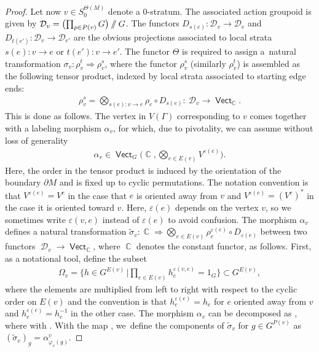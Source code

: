 \documentclass[10pt,a4paper]{amsart}
\DeclareMathOperator{\vect}{\mathsf{Vect}}
\DeclareMathOperator{\C}{\mathbb{C}}
\DeclareMathOperator{\cald}{\mathcal{D}}
\newcommand{\sslash}{\mathbin{/\mkern-6mu/}}
\numberwithin{equation}{section}
\theoremstyle{definition}
\begin{document}
\begin{proof}
 Let now $v \in S_0^{\Theta(M)}$ denote a 0-stratum. The associated action groupoid is given by $\mathcal{D}_v = \bigl(\prod_{p \in P(v)}G\bigr) \sslash G$. The functors $D_{s(e)}\colon \mathcal{D}_{v} \rightarrow \mathcal{D}_e$ and $D_{t(e')}\colon \mathcal{D}_{v} \rightarrow \mathcal{D}_{e'}$ are the obvious projections associated to local strata $s(e)\colon v \rightarrow e$ or $t(e')\colon v \rightarrow e'$. The functor $\Theta$ is required to assign a~natural transformation $\sigma_v\colon \rho_v^t \Rightarrow \rho_v^s$, where the functor $\rho_v^s$ (similarly $\rho_v^t$) is assembled as the following tensor product, indexed by local strata associated to starting edge ends:
 \begin{align*}
 \rho_v^s = \bigotimes_{s(e)\colon v \rightarrow e}\rho_e \circ D_{s(e)}\colon \ \mathcal{D}_v \rightarrow \vect_{\C}.
 \end{align*}
 This is done as follows. The vertex in $V(\Gamma)$ corresponding to $v$ comes together with a labeling morphism $\alpha_v$, for which, due to pivotality, we can assume without loss of generality
 \begin{align*}
 \alpha_v \in \vect_G\biggl(\C, \bigotimes_{e \in E(v)}V^{\varepsilon(e)}\biggr).
 \end{align*}
 Here, the order in the tensor product is induced by the orientation of the boundary $\partial M$ and is fixed up to cyclic permutations. The notation convention is that $V^{\varepsilon(e)} = V^e$ in the case that $e$ is oriented away from $v$ and $V^{\varepsilon(e)} = (V^e)^*$ in the case it is oriented toward $v$. Here, $\varepsilon(e)$ depends on the vertex $v$, so we sometimes write $\varepsilon(v, e)$ instead of $\varepsilon(e)$ to avoid confusion.
 The morphism $\alpha_v$ defines a natural transformation $\widetilde{\sigma}_v\colon \C \Rightarrow \bigotimes_{e \in E(v)} \rho_e^{\varepsilon(e)}\circ D_{\varepsilon(e)}$ between two functors $\cald_v \rightarrow \vect_{\C}$, where $\C$ denotes the constant functor, as follows. First, as a notational tool, define the subset
 \begin{align*}
 \Omega_v = \bigg\{h \in G^{E(v)} \, \bigg| \prod_{e \in E(v)}h_e^{\varepsilon(v, e)} = 1_G \bigg\} \subset G^{E(v)},
 \end{align*}
 where the elements are multiplied from left to right with respect to the cyclic order on $E(v)$ and the convention is that $h_e^{\varepsilon(e)} = h_e$ for $e$ oriented away from $v$ and $h_e^{\varepsilon(e)} = h_e^{-1}$ in the other case. The morphism $\alpha_v$ can be decomposed as , where \smash{$\alpha_h^v\colon \C \rightarrow \bigotimes_{e \in E(v)} \bigl(V_{h_e}^e \bigr)^{\varepsilon(e)}$} with . With the map , we~define the components of $\widetilde{\sigma}_v$ for $g \in G^{P(v)}$ as $(\widetilde{\sigma}_v)_g = \alpha_{\varphi_v(g)}^v$.

\end{proof}
\end{document}
